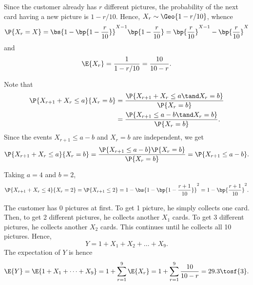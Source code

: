 \begin{solution}
    \begin{ppart}
        Since the customer already has $r$ different pictures, the probability of the next card having a new picture is $1 - r/10$. Hence, $X_r \sim \Geo{1 - r/10}$, whence \[\P{X_r = X} = \bs{1 - \bp{1 - \frac{r}{10}}}^{X - 1} \bp{1 - \frac{r}{10}} = \bp{\frac{r}{10}}^{X-1} - \bp{\frac{r}{10}}^{X}\] and \[\E{X_r} = \frac{1}{1- r/10} = \frac{10}{10 - r}.\]
    \end{ppart}
    \begin{ppart}
        Note that
        \begin{align*}
            \P{X_{r+1} + X_r \leq a}{X_r = b} &= \frac{\P{X_{r+1} + X_r \leq a \tand X_r = b}}{\P{X_r = b}}\\
            &= \frac{\P{X_{r+1} \leq a - b \tand X_r = b}}{\P{X_r = b}}.
        \end{align*}
        Since the events $X_{r+1} \leq a - b$ and $X_r = b$ are independent, we get \[\P{X_{r+1} + X_r \leq a}{X_r = b} = \frac{\P{X_{r+1} \leq a - b} \P{X_r = b}}{\P{X_r = b}} = \P{X_{r+1} \leq a - b}.\]

        Taking $a = 4$ and $b = 2$, \[\P{X_{r+1} + X_r \leq 4}{X_r = 2} = \P{X_{r+1} \leq 2} = 1 - \bs{1 - \bp{1 - \frac{r + 1}{10}}}^2 = 1 - \bp{\frac{r+1}{10}}^2.\]
    \end{ppart}
    \begin{ppart}
        The customer has 0 pictures at first. To get 1 picture, he simply collects one card. Then, to get 2 different pictures, he collects another $X_1$ cards. To get 3 different pictures, he collects another $X_2$ cards. This continues until he collects all 10 pictures. Hence, \[Y = 1 + X_1 + X_2 + \dots + X_9.\] The expectation of $Y$ is hence \[\E{Y} = \E{1 + X_1 + \dots + X_9} = 1 + \sum_{r = 1}^9 \E{X_r} = 1 + \sum_{r = 1}^9 \frac{10}{10 - r} = 29.3 \tosf{3}.\]
    \end{ppart}
\end{solution}